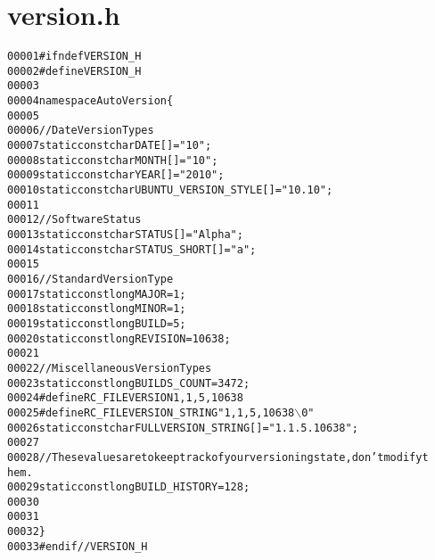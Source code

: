\hypertarget{version_8h_source}{
\section{version.h}
}


\begin{footnotesize}\begin{alltt}
00001 \textcolor{preprocessor}{#ifndef VERSION\_H}
00002 \textcolor{preprocessor}{}\textcolor{preprocessor}{#define VERSION\_H}
00003 \textcolor{preprocessor}{}
00004 \textcolor{keyword}{namespace }AutoVersion\{
00005         
00006         \textcolor{comment}{//Date Version Types}
00007         \textcolor{keyword}{static} \textcolor{keyword}{const} \textcolor{keywordtype}{char} DATE[] = \textcolor{stringliteral}{"10"};
00008         \textcolor{keyword}{static} \textcolor{keyword}{const} \textcolor{keywordtype}{char} MONTH[] = \textcolor{stringliteral}{"10"};
00009         \textcolor{keyword}{static} \textcolor{keyword}{const} \textcolor{keywordtype}{char} YEAR[] = \textcolor{stringliteral}{"2010"};
00010         \textcolor{keyword}{static} \textcolor{keyword}{const} \textcolor{keywordtype}{char} UBUNTU\_VERSION\_STYLE[] = \textcolor{stringliteral}{"10.10"};
00011         
00012         \textcolor{comment}{//Software Status}
00013         \textcolor{keyword}{static} \textcolor{keyword}{const} \textcolor{keywordtype}{char} STATUS[] = \textcolor{stringliteral}{"Alpha"};
00014         \textcolor{keyword}{static} \textcolor{keyword}{const} \textcolor{keywordtype}{char} STATUS\_SHORT[] = \textcolor{stringliteral}{"a"};
00015         
00016         \textcolor{comment}{//Standard Version Type}
00017         \textcolor{keyword}{static} \textcolor{keyword}{const} \textcolor{keywordtype}{long} MAJOR = 1;
00018         \textcolor{keyword}{static} \textcolor{keyword}{const} \textcolor{keywordtype}{long} MINOR = 1;
00019         \textcolor{keyword}{static} \textcolor{keyword}{const} \textcolor{keywordtype}{long} BUILD = 5;
00020         \textcolor{keyword}{static} \textcolor{keyword}{const} \textcolor{keywordtype}{long} REVISION = 10638;
00021         
00022         \textcolor{comment}{//Miscellaneous Version Types}
00023         \textcolor{keyword}{static} \textcolor{keyword}{const} \textcolor{keywordtype}{long} BUILDS\_COUNT = 3472;
00024 \textcolor{preprocessor}{        #define RC\_FILEVERSION 1,1,5,10638}
00025 \textcolor{preprocessor}{}\textcolor{preprocessor}{        #define RC\_FILEVERSION\_STRING "1, 1, 5, 10638\(\backslash\)0"}
00026 \textcolor{preprocessor}{}        \textcolor{keyword}{static} \textcolor{keyword}{const} \textcolor{keywordtype}{char} FULLVERSION\_STRING[] = \textcolor{stringliteral}{"1.1.5.10638"};
00027         
00028         \textcolor{comment}{//These values are to keep track of your versioning state, don't modify t
      hem.}
00029         \textcolor{keyword}{static} \textcolor{keyword}{const} \textcolor{keywordtype}{long} BUILD\_HISTORY = 128;
00030         
00031 
00032 \}
00033 \textcolor{preprocessor}{#endif //VERSION\_H}
\end{alltt}\end{footnotesize}
